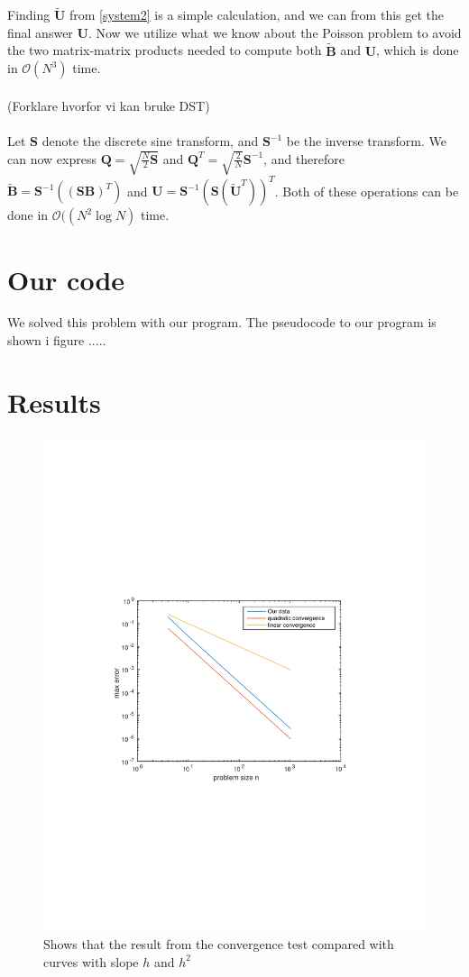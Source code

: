 \documentclass[10pt, a4paper]{article} %
\begin{document}
Finding $\mathbf{\widetilde{U}}$ from \eqref{system2} is a simple calculation, and we can from this get the final answer $\mathbf{U}$. Now we utilize what we know about the Poisson problem to avoid the two matrix-matrix products needed to compute both $\mathbf{\widetilde{B}}$ and $\mathbf{U}$, which is done in $\mathcal{O}(N^3)$ time. \\
\\
(Forklare hvorfor vi kan bruke DST)
\\
\\
Let $\mathbf{S}$ denote the discrete sine transform, and $\mathbf{S}^{-1}$ be the inverse transform. We can now express $\mathbf{Q} = \sqrt{\frac{N}{2}\mathbf{S}}$ and $\mathbf{Q}^T = \sqrt{\frac{2}{N}}\mathbf{S}^{-1}$, and therefore $\mathbf{\widetilde{B}} = \mathbf{S}^{-1}((\mathbf{SB})^T)$ and $\mathbf{U} = \mathbf{S}^{-1}(\mathbf{S}(\mathbf{\widetilde{U}}^T))^T$. Both of these operations can be done in $\mathcal{O}((N^2\log{N})$ time. 

\section*{Our code}
We solved this problem with our program. The pseudocode to our program is shown i figure ..... 



\section*{Results}

\begin{figure}[h]
\centering
\includegraphics[width=0.7\linewidth, trim= 3cm 8.5cm 3cm 9cm, clip=true]{checkConv}
\caption{Shows that the result from the convergence test compared with curves with slope $h$ and $h^2$}
\label{fig:checkConv}
\end{figure}
\end{document}
